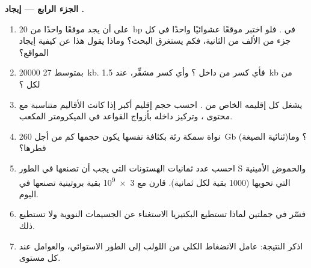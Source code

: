 \begin{problem}
\medskip
\noindent\textbf{الجزء الرابع --- إيجاد .}
\begin{enumerate}[resume]
  \item على  أن يجد موقعًا واحدًا من \qty{20}{bp} في .
        فلو اختبر موقعًا عشوائيًا واحدًا في كل جزء من الألف من الثانية،
        فكم يستغرق البحث؟ وماذا يقول هذا عن كيفية إيجاد المواقع؟
  \item {}  \qty{20000}{} بمتوسط \qty{27}{kb}. فأي كسر من
         داخل ؟ وأي كسر مشفِّر، عند \qty{1.5}{kb} من
         لكل ؟
  \item يشغل كل  إقليمه الخاص من . احسب حجم إقليم أكبر
         إذا كانت الأقاليم متناسبة مع محتوى ، وتركيز  داخله
        بأزواج القواعد في الميكرومتر المكعب.
  \item نواة سمكة رئة بكثافة  نفسها يكون حجمها كم من أجل
        \qty{260}{Gb} (ثنائية الصيغة)؟ وما قطرها؟
  \item احسب عدد ثمانيات الهستونات التي يجب أن تصنعها  في الطور S
        والحموض الأمينية التي تحويها (\qty{1000}{} بقية لكل ثمانية).
        قارن مع \qty{3e9}{} بقية بروتينية تصنعها  في اليوم.
  \item فسّر في جملتين لماذا تستطيع البكتيريا الاستغناء عن الجسيمات
        النووية ولا تستطيع  ذلك.
  \item اذكر النتيجة: عامل الانضغاط الكلي من اللولب إلى  الطور
        الاستوائي، والعوامل عند كل مستوى.
\end{enumerate}
\end{problem}
